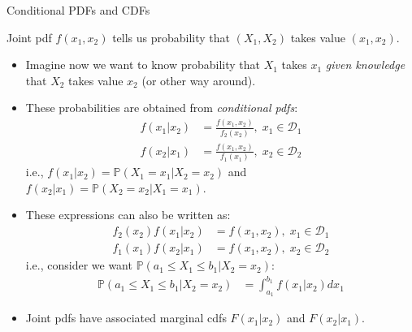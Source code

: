 \documentclass[handout,9pt]{beamer}
\begin{document}
%
\begin{frame}{Conditional PDFs and CDFs}

Joint pdf $f(x_1,x_2)$ tells us probability that $(X_1,X_2)$ takes value $(x_1,x_2)$.

\begin{itemize}
\setlength{\itemsep}{5pt}
\item Imagine now we want to know probability that $X_1$ takes $x_1$ {\em given knowledge} that $X_2$ takes value $x_2$ (or other way around). 

\item These probabilities are obtained from {\em conditional pdfs}:
\begin{align*}
f(x_1|x_2)&=\frac{f(x_1,x_2)}{f_2(x_2)},\; x_1\in \mathcal{D}_1\\
f(x_2|x_1)&=\frac{f(x_1,x_2)}{f_1(x_1)},\; x_2\in \mathcal{D}_2
\end{align*}
i.e., $f(x_1|x_2)=\mathbb{P}(X_1=x_1|X_2=x_2)$ and $f(x_2|x_1)=\mathbb{P}(X_2=x_2|X_1=x_1)$.
\item These expressions can also be written as:
 \begin{align*}
{f_2(x_2)}f(x_1|x_2)&={f(x_1,x_2)},\; x_1\in \mathcal{D}_1\\
{f_1(x_1)}f(x_2|x_1)&={f(x_1,x_2)},\; x_2\in \mathcal{D}_2
\end{align*}
i.e., consider we want $\mathbb{P}(a_1\leq X_1\leq b_1|X_2=x_2)$:
\begin{align*}
\mathbb{P}(a_1\leq X_1\leq b_1|X_2=x_2)&=\int_{a_1}^{b_1}f(x_1|x_2)dx_1
\end{align*}

\item Joint pdfs have associated marginal cdfs $F(x_1|x_2)$ and $F(x_2|x_1)$. 

\end{itemize}

\end{frame}
\end{document}
